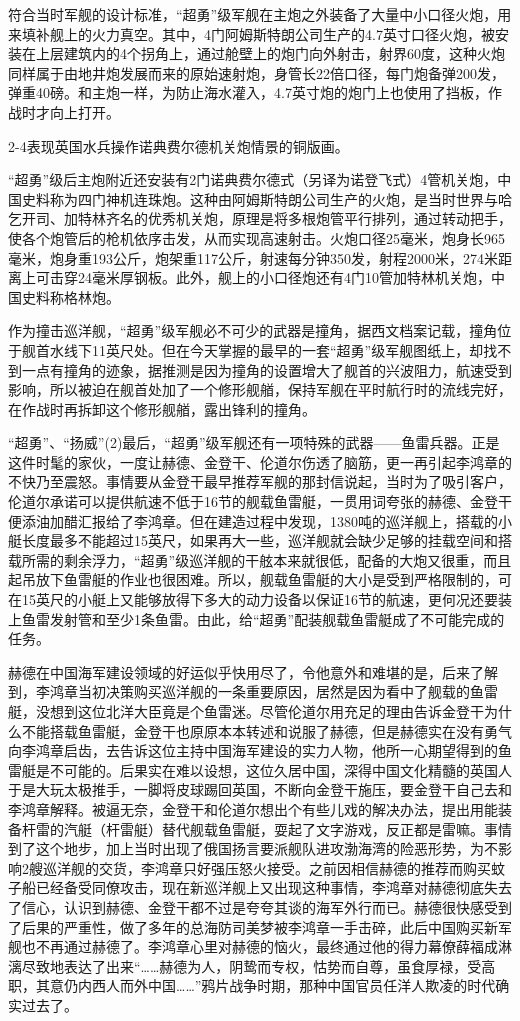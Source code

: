 \documentclass[12pt,UTF8]{ctexbook}
\begin{document}
符合当时军舰的设计标准，“超勇”级军舰在主炮之外装备了大量中小口径火炮，用来填补舰上的火力真空。其中，4门阿姆斯特朗公司生产的4.7英寸口径火炮，被安装在上层建筑内的4个拐角上，通过舱壁上的炮门向外射击，射界60度，这种火炮同样属于由地井炮发展而来的原始速射炮，身管长22倍口径，每门炮备弹200发，弹重40磅。和主炮一样，为防止海水灌入，4.7英寸炮的炮门上也使用了挡板，作战时才向上打开。

2-4表现英国水兵操作诺典费尔德机关炮情景的铜版画。

“超勇”级后主炮附近还安装有2门诺典费尔德式（另译为诺登飞式）4管机关炮，中国史料称为四门神机连珠炮。这种由阿姆斯特朗公司生产的火炮，是当时世界与哈乞开司、加特林齐名的优秀机关炮，原理是将多根炮管平行排列，通过转动把手，使各个炮管后的枪机依序击发，从而实现高速射击。火炮口径25毫米，炮身长965毫米，炮身重193公斤，炮架重117公斤，射速每分钟350发，射程2000米，274米距离上可击穿24毫米厚钢板。此外，舰上的小口径炮还有4门10管加特林机关炮，中国史料称格林炮。

作为撞击巡洋舰，“超勇”级军舰必不可少的武器是撞角，据西文档案记载，撞角位于舰首水线下11英尺处。但在今天掌握的最早的一套“超勇”级军舰图纸上，却找不到一点有撞角的迹象，据推测是因为撞角的设置增大了舰首的兴波阻力，航速受到影响，所以被迫在舰首处加了一个修形舰艏，保持军舰在平时航行时的流线完好，在作战时再拆卸这个修形舰艏，露出锋利的撞角。

“超勇”、“扬威”(2)最后，“超勇”级军舰还有一项特殊的武器——鱼雷兵器。正是这件时髦的家伙，一度让赫德、金登干、伦道尔伤透了脑筋，更一再引起李鸿章的不快乃至震怒。事情要从金登干最早推荐军舰的那封信说起，当时为了吸引客户，伦道尔承诺可以提供航速不低于16节的舰载鱼雷艇，一贯用词夸张的赫德、金登干便添油加醋汇报给了李鸿章。但在建造过程中发现，1380吨的巡洋舰上，搭载的小艇长度最多不能超过15英尺，如果再大一些，巡洋舰就会缺少足够的挂载空间和搭载所需的剩余浮力，“超勇”级巡洋舰的干舷本来就很低，配备的大炮又很重，而且起吊放下鱼雷艇的作业也很困难。所以，舰载鱼雷艇的大小是受到严格限制的，可在15英尺的小艇上又能够放得下多大的动力设备以保证16节的航速，更何况还要装上鱼雷发射管和至少1条鱼雷。由此，给“超勇”配装舰载鱼雷艇成了不可能完成的任务。

赫德在中国海军建设领域的好运似乎快用尽了，令他意外和难堪的是，后来了解到，李鸿章当初决策购买巡洋舰的一条重要原因，居然是因为看中了舰载的鱼雷艇，没想到这位北洋大臣竟是个鱼雷迷。尽管伦道尔用充足的理由告诉金登干为什么不能搭载鱼雷艇，金登干也原原本本转述和说服了赫德，但是赫德实在没有勇气向李鸿章启齿，去告诉这位主持中国海军建设的实力人物，他所一心期望得到的鱼雷艇是不可能的。后果实在难以设想，这位久居中国，深得中国文化精髓的英国人于是大玩太极推手，一脚将皮球踢回英国，不断向金登干施压，要金登干自己去和李鸿章解释。被逼无奈，金登干和伦道尔想出个有些儿戏的解决办法，提出用能装备杆雷的汽艇（杆雷艇）替代舰载鱼雷艇，耍起了文字游戏，反正都是雷嘛。事情到了这个地步，加上当时出现了俄国扬言要派舰队进攻渤海湾的险恶形势，为不影响2艘巡洋舰的交货，李鸿章只好强压怒火接受。之前因相信赫德的推荐而购买蚊子船已经备受同僚攻击，现在新巡洋舰上又出现这种事情，李鸿章对赫德彻底失去了信心，认识到赫德、金登干都不过是夸夸其谈的海军外行而已。赫德很快感受到了后果的严重性，做了多年的总海防司美梦被李鸿章一手击碎，此后中国购买新军舰也不再通过赫德了。李鸿章心里对赫德的恼火，最终通过他的得力幕僚薛福成淋漓尽致地表达了出来“……赫德为人，阴鸷而专权，怙势而自尊，虽食厚禄，受高职，其意仍内西人而外中国……”鸦片战争时期，那种中国官员任洋人欺凌的时代确实过去了。
\end{document}
